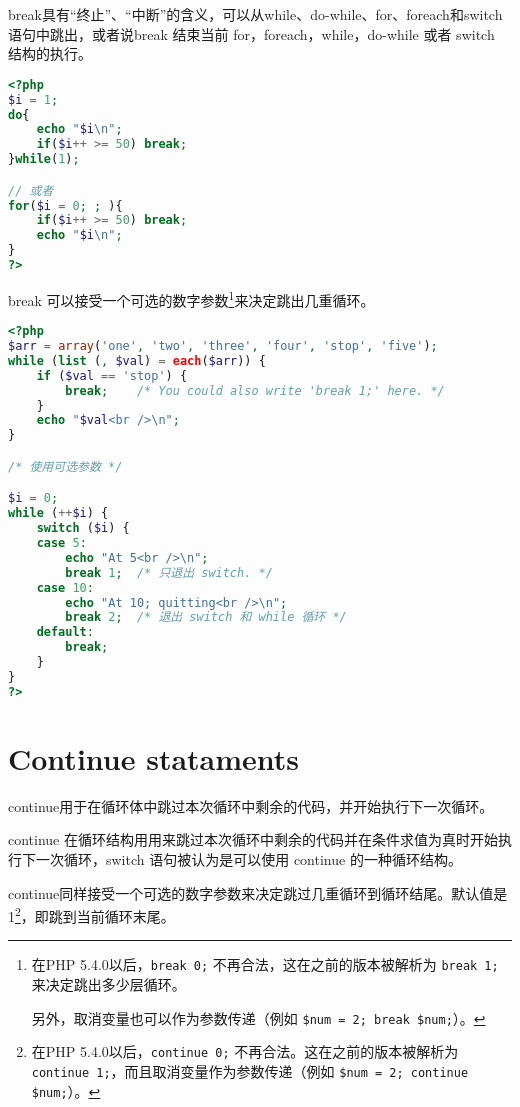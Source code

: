 break具有“终止”、“中断”的含义，可以从while、do-while、for、foreach和switch语句中跳出，或者说break 结束当前 for，foreach，while，do-while 或者 switch 结构的执行。

\begin{lstlisting}[language=PHP]
<?php
$i = 1;
do{
	echo "$i\n";
	if($i++ >= 50) break;
}while(1);

// 或者
for($i = 0; ; ){
	if($i++ >= 50) break;
	echo "$i\n";
}
?>
\end{lstlisting}

break 可以接受一个可选的数字参数\footnote{在PHP 5.4.0以后，\texttt{break 0;} 不再合法，这在之前的版本被解析为 \texttt{break 1;}来决定跳出多少层循环。

另外，取消变量也可以作为参数传递（例如 \texttt{\$num = 2; break \$num;}）。}来决定跳出几重循环。


\begin{lstlisting}[language=PHP]
<?php
$arr = array('one', 'two', 'three', 'four', 'stop', 'five');
while (list (, $val) = each($arr)) {
    if ($val == 'stop') {
        break;    /* You could also write 'break 1;' here. */
    }
    echo "$val<br />\n";
}

/* 使用可选参数 */

$i = 0;
while (++$i) {
    switch ($i) {
    case 5:
        echo "At 5<br />\n";
        break 1;  /* 只退出 switch. */
    case 10:
        echo "At 10; quitting<br />\n";
        break 2;  /* 退出 switch 和 while 循环 */
    default:
        break;
    }
}
?>
\end{lstlisting}






\section{Continue stataments}


continue用于在循环体中跳过本次循环中剩余的代码，并开始执行下一次循环。



continue 在循环结构用用来跳过本次循环中剩余的代码并在条件求值为真时开始执行下一次循环，switch 语句被认为是可以使用 continue 的一种循环结构。

continue同样接受一个可选的数字参数来决定跳过几重循环到循环结尾。默认值是 1\footnote{在PHP 5.4.0以后，\texttt{continue 0;} 不再合法。这在之前的版本被解析为 \texttt{continue 1;}，而且取消变量作为参数传递（例如 \texttt{\$num = 2; continue \$num;}）。}，即跳到当前循环末尾。

